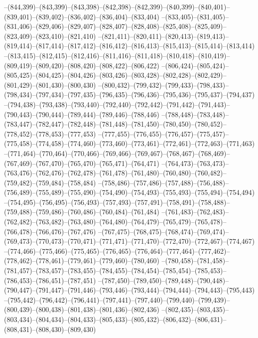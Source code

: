 --(844,399)--(843,399)--(843,398)--(842,398)--(842,399)--(840,399)--(840,401)--(839,401)--(839,402)--(836,402)--(836,404)--(833,404)
--(833,405)--(831,405)--(831,406)--(829,406)--(829,407)--(828,407)--(828,408)--(825,408)--(825,409)--(823,409)--(823,410)--(821,410)
--(821,411)--(820,411)--(820,413)--(819,413)--(819,414)--(817,414)--(817,412)--(816,412)--(816,413)--(815,413)--(815,414)--(813,414)
--(813,415)--(812,415)--(812,416)--(811,416)--(811,418)--(810,418)--(810,419)--(809,419)--(809,420)--(808,420)--(808,422)--(806,422)
--(806,424)--(805,424)--(805,425)--(804,425)--(804,426)--(803,426)--(803,428)--(802,428)--(802,429)--(801,429)--(801,430)--(800,430)
--(800,432)--(799,432)--(799,433)--(798,433)--(798,434)--(797,434)--(797,435)--(796,435)--(796,436)--(795,436)--(795,437)--(794,437)
--(794,438)--(793,438)--(793,440)--(792,440)--(792,442)--(791,442)--(791,443)--(790,443)--(790,444)--(789,444)--(789,446)--(788,446)
--(788,448)--(783,448)--(783,447)--(782,447)--(782,448)--(781,448)--(781,450)--(780,450)--(780,452)--(778,452)--(778,453)--(777,453)
--(777,455)--(776,455)--(776,457)--(775,457)--(775,458)--(774,458)--(774,460)--(773,460)--(773,461)--(772,461)--(772,463)--(771,463)
--(771,464)--(770,464)--(770,466)--(769,466)--(769,467)--(768,467)--(768,469)--(767,469)--(767,470)--(765,470)--(765,471)--(764,471)
--(764,473)--(763,473)--(763,476)--(762,476)--(762,478)--(761,478)--(761,480)--(760,480)--(760,482)--(759,482)--(759,484)--(758,484)
--(758,486)--(757,486)--(757,488)--(756,488)--(756,489)--(755,489)--(755,490)--(754,490)--(754,493)--(755,493)--(755,494)--(754,494)
--(754,495)--(756,495)--(756,493)--(757,493)--(757,491)--(758,491)--(758,488)--(759,488)--(759,486)--(760,486)--(760,484)--(761,484)
--(761,483)--(762,483)--(762,482)--(763,482)--(763,480)--(764,480)--(764,479)--(765,479)--(765,478)--(766,478)--(766,476)--(767,476)
--(767,475)--(768,475)--(768,474)--(769,474)--(769,473)--(770,473)--(770,471)--(771,471)--(771,470)--(772,470)--(772,467)--(774,467)
--(774,466)--(775,466)--(775,465)--(776,465)--(776,464)--(777,464)--(777,462)--(778,462)--(778,461)--(779,461)--(779,460)--(780,460)
--(780,458)--(781,458)--(781,457)--(783,457)--(783,455)--(784,455)--(784,454)--(785,454)--(785,453)--(786,453)--(786,451)--(787,451)
--(787,450)--(789,450)--(789,448)--(790,448)--(790,447)--(791,447)--(791,446)--(793,446)--(793,444)--(794,444)--(794,443)--(795,443)
--(795,442)--(796,442)--(796,441)--(797,441)--(797,440)--(799,440)--(799,439)--(800,439)--(800,438)--(801,438)--(801,436)--(802,436)
--(802,435)--(803,435)--(803,434)--(804,434)--(804,433)--(805,433)--(805,432)--(806,432)--(806,431)--(808,431)--(808,430)--(809,430)
